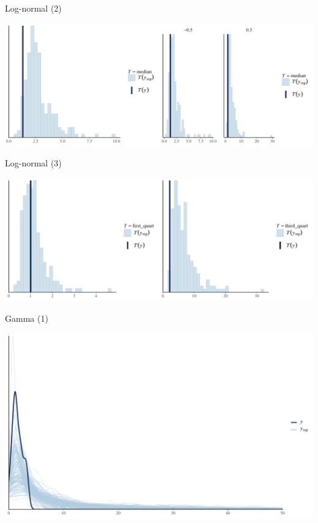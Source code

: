 \documentclass[ignorenonframetext,a4paper]{beamer}
\begin{document}
\begin{frame}{Log-normal (2)}

\includegraphics{DB_presentation_case_study_files/figure-beamer/unnamed-chunk-16-1.pdf}

\end{frame}

\begin{frame}{Log-normal (3)}

\includegraphics{DB_presentation_case_study_files/figure-beamer/unnamed-chunk-17-1.pdf}

\end{frame}

\begin{frame}{Gamma (1)}

\includegraphics{DB_presentation_case_study_files/figure-beamer/unnamed-chunk-18-1.pdf}

\end{frame}
\end{document}
